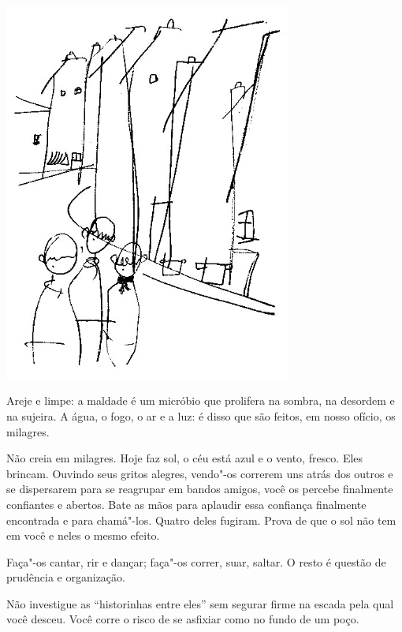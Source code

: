 \begin{vplace}[.50]
\begin{center}
\includegraphics[width=95mm]{./imgs/Image_9.jpg}
\end{center}
\end{vplace}

\pagebreak

Areje e limpe: a maldade é um micróbio que prolifera na sombra, na
desordem e na sujeira. A água, o fogo, o ar e a luz: é disso que são
feitos, em nosso ofício, os milagres.

\bigskip
\bigskip

Não creia em milagres. Hoje faz sol, o céu está azul e o vento, fresco.
Eles brincam. Ouvindo seus gritos alegres, vendo"-os correrem uns atrás
dos outros e se dispersarem para se reagrupar em bandos amigos, você os
percebe finalmente confiantes e abertos. Bate as mãos para aplaudir essa
confiança finalmente encontrada e para chamá"-los. Quatro deles fugiram.
Prova de que o sol não tem em você e neles o mesmo efeito.

\bigskip
\bigskip

Faça"-os cantar, rir e dançar; faça"-os correr, suar, saltar. O resto é
questão de prudência e organização.

\bigskip
\bigskip

Não investigue as ``historinhas entre eles'' sem segurar firme na escada
pela qual você desceu. Você corre o risco de se asfixiar como no fundo
de um poço.

